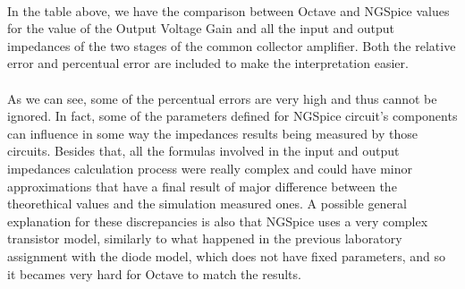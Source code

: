\begin{center}
   \begin{table}[H]
\end{table}
\end{center}

\paragraph{}
In the table above, we have the comparison between Octave and NGSpice values for the value of the Output Voltage Gain and all the input and output impedances of the two stages of the common collector amplifier. Both the relative error and percentual error are included to make the interpretation easier. 

\paragraph{}
As we can see, some of the percentual errors are very high and thus cannot be ignored. In fact, some of the parameters defined for NGSpice circuit's components can influence in some way the impedances results being measured by those circuits. Besides that, all the formulas involved in the input and output impedances calculation process were really complex and could have minor approximations that have a final result of major difference between the theorethical values and the simulation measured ones. A possible general explanation for these discrepancies is also that NGSpice uses a very complex transistor model, similarly to what happened in the previous laboratory assignment with the diode model, which does not have fixed parameters, and so it becames very hard for Octave to match the results. 

